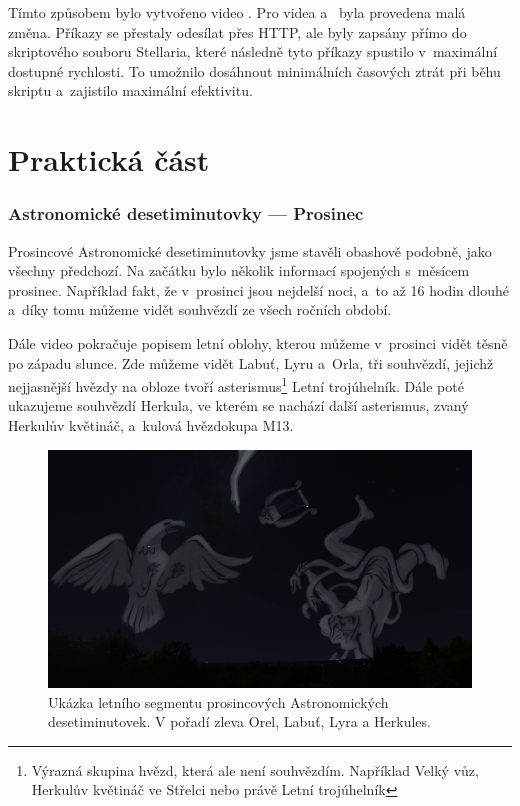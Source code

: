 \documentclass[12pt,a4paper,titlepage]{article}
\begin{document}
Tímto způsobem bylo vytvořeno video . Pro videa  a~ byla provedena malá změna. Příkazy se přestaly odesílat přes HTTP, ale byly zapsány přímo do skriptového souboru Stellaria, které následně tyto příkazy spustilo v~maximální dostupné rychlosti. To umožnilo dosáhnout minimálních časových ztrát při běhu skriptu a~zajistilo maximální efektivitu.
\newpage
\part{Praktická část}
\section{Astronomické desetiminutovky --- Prosinec}
Prosincové Astronomické desetiminutovky jsme stavěli obashově podobně, jako všechny předchozí. Na začátku bylo několik informací spojených s~měsícem prosinec. Například fakt, že v~prosinci jsou nejdelší noci, a~to až 16 hodin dlouhé a~díky tomu můžeme vidět souhvězdí ze všech ročních období. 

Dále video pokračuje popisem letní oblohy, kterou můžeme v~prosinci vidět těsně po západu slunce. Zde můžeme vidět Labuť, Lyru a~Orla, tři souhvězdí, jejichž nejjasnější hvězdy na obloze tvoří asterismus\footnote{Výrazná skupina hvězd, která ale není souhvězdím. Například Velký vůz, Herkulův květináč ve Střelci nebo právě Letní trojúhelník} Letní trojúhelník. Dále poté ukazujeme souhvězdí Herkula, ve kterém se nachází další asterismus, zvaný Herkulův květináč, a~kulová hvězdokupa M13.

\begin{figure}[H]
	\centering
	\includegraphics[width=.95\textwidth]{ac12_leto.png}
	\caption{Ukázka letního segmentu prosincových Astronomických desetiminutovek. V pořadí zleva Orel, Labuť, Lyra a Herkules.}\label{prac:ac12_leto}
\end{figure}
\end{document}
